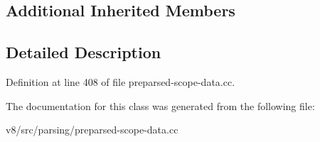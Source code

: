 \subsection*{Additional Inherited Members}


\subsection{Detailed Description}


Definition at line 408 of file preparsed-\/scope-\/data.\+cc.



The documentation for this class was generated from the following file\+:\begin{DoxyCompactItemize}
\item 
v8/src/parsing/preparsed-\/scope-\/data.\+cc\end{DoxyCompactItemize}
